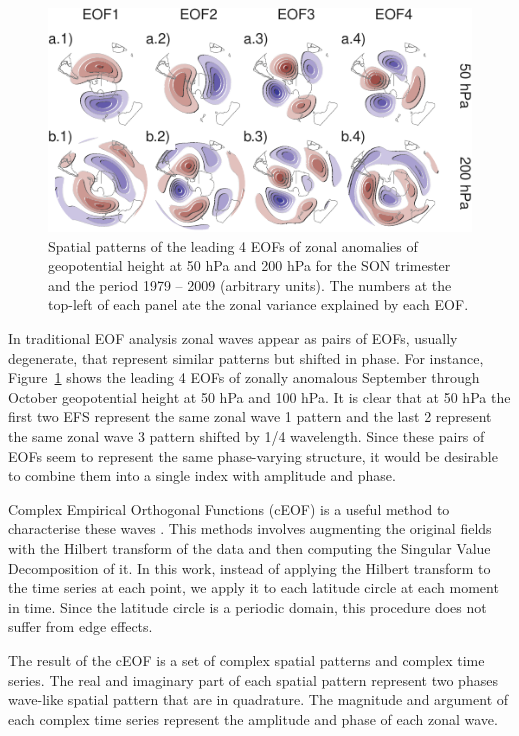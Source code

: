 \documentclass[smallextended]{svjour3}       %
\begin{document}
\begin{figure}
\centering
\includegraphics{../figures/eof-naive-1.pdf}
\caption{\label{fig:eof-naive}Spatial patterns of the leading 4 EOFs of zonal anomalies of geopotential height at 50 hPa and 200 hPa for the SON trimester and the period 1979 -- 2009 (arbitrary units). The numbers at the top-left of each panel ate the zonal variance explained by each EOF.}
\end{figure}

In traditional EOF analysis zonal waves appear as pairs of EOFs, usually degenerate, that represent similar patterns but shifted in phase. For instance, Figure~\ref{fig:eof-naive} shows the leading 4 EOFs of zonally anomalous September through October geopotential height at 50 hPa and 100 hPa. It is clear that at 50 hPa the first two EFS represent the same zonal wave 1 pattern and the last 2 represent the same zonal wave 3 pattern shifted by 1/4 wavelength. Since these pairs of EOFs seem to represent the same phase-varying structure, it would be desirable to combine them into a single index with amplitude and phase.

Complex Empirical Orthogonal Functions (cEOF) is a useful method to characterise these waves \citep{horel1984}. This methods involves augmenting the original fields with the Hilbert transform of the data and then computing the Singular Value Decomposition of it. In this work, instead of applying the Hilbert transform to the time series at each point, we apply it to each latitude circle at each moment in time. Since the latitude circle is a periodic domain, this procedure does not suffer from edge effects.

The result of the cEOF is a set of complex spatial patterns and complex time series. The real and imaginary part of each spatial pattern represent two phases wave-like spatial pattern that are in quadrature. The magnitude and argument of each complex time series represent the amplitude and phase of each zonal wave.
\end{document}
